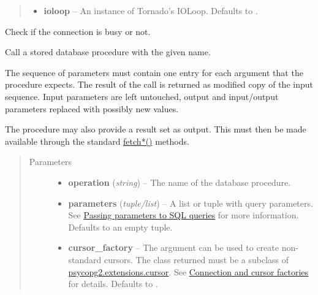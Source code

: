 \documentclass[letterpaper,10pt,english]{sphinxmanual}
\begin{document}
\begin{fulllineitems}
\begin{quote}
\begin{description}
\begin{itemize}
\item {} 
\textbf{ioloop} -- An instance of Tornado's IOLoop. Defaults to .

\end{itemize}

\end{description}\end{quote}

\begin{fulllineitems}
\label{api:momoko.Connection.busy}
Check if the connection is busy or not.

\end{fulllineitems}


\begin{fulllineitems}
\label{api:momoko.Connection.callproc}
Call a stored database procedure with the given name.

The sequence of parameters must contain one entry for each argument that
the procedure expects. The result of the call is returned as modified copy
of the input sequence. Input parameters are left untouched, output and
input/output parameters replaced with possibly new values.

The procedure may also provide a result set as output. This must then be
made available through the standard \href{http://initd.org/psycopg/docs/cursor.html\#fetch}{fetch*()} methods.
\begin{quote}\begin{description}
\item[{Parameters}] \leavevmode\begin{itemize}
\item {} 
\textbf{operation} (\emph{string}) -- The name of the database procedure.

\item {} 
\textbf{parameters} (\emph{tuple/list}) -- A list or tuple with query parameters. See \href{http://initd.org/psycopg/docs/usage.html\#query-parameters}{Passing parameters to SQL queries}
for more information. Defaults to an empty tuple.

\item {} 
\textbf{cursor\_factory} -- The  argument can be used to create non-standard cursors.
The class returned must be a subclass of \href{http://initd.org/psycopg/docs/extensions.html\#psycopg2.extensions.cursor}{psycopg2.extensions.cursor}.
See \href{http://initd.org/psycopg/docs/advanced.html\#subclassing-cursor}{Connection and cursor factories} for details. Defaults to .


\end{itemize}
\end{description}
\end{quote}
\end{fulllineitems}
\end{fulllineitems}
\end{document}

